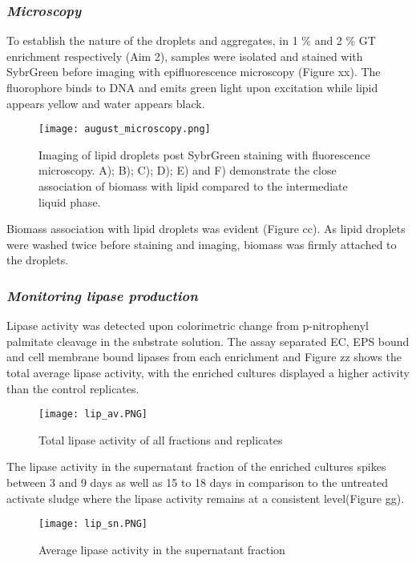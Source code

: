 \documentclass[11pt]{article}
\begin{document}
\subsubsection{\emph{Microscopy}}
To establish the nature of the droplets and aggregates, in 1 \% and 2 \% GT enrichment respectively (Aim 2), samples were isolated and stained with SybrGreen before imaging with epifluorescence microscopy (Figure xx). The fluorophore binds to DNA and emits green light upon excitation while lipid appears yellow and water appears black.

\begin{figure}
\texttt{[image: august\_microscopy.png]}
\caption{Imaging of lipid droplets post SybrGreen staining with fluorescence microscopy. A); B); C); D); E) and F) demonstrate the close association of biomass with lipid compared to the intermediate liquid phase.}
\end{figure}


Biomass association with lipid droplets was evident (Figure cc). As lipid droplets were washed twice before staining and imaging, biomass was firmly attached to the droplets.
\FloatBarrier
\subsubsection{\emph{Monitoring lipase production}}
Lipase activity was detected upon colorimetric change from p-nitrophenyl palmitate cleavage in the substrate solution. The assay separated  EC, EPS bound and cell membrane bound lipases from each enrichment and Figure zz shows the total average lipase activity, with the enriched cultures displayed a higher activity than the control replicates.
                                                                                                                                                                                                                                         

\begin{figure}
\texttt{[image: lip\_av.PNG]}
\caption{Total lipase activity of all fractions and replicates}
\end{figure}

The lipase activity in the supernatant fraction of the enriched cultures spikes between 3 and 9 days as well as 15 to 18 days in comparison to the untreated activate sludge where the lipase activity remains at a consistent level(Figure gg).

\begin{figure}
\texttt{[image: lip\_sn.PNG]}
\caption{Average lipase activity in the supernatant fraction}
\end{figure}
\end{document}
